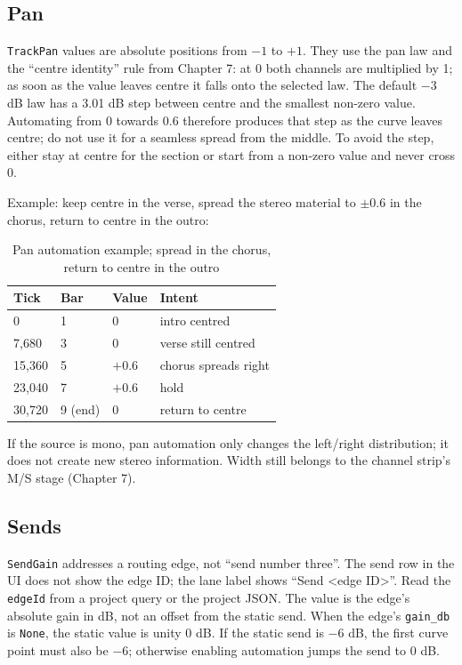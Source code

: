 \subsection{Pan}

\texttt{TrackPan} values are absolute positions from $-1$ to $+1$. They use the pan law and the ``centre identity'' rule from Chapter 7: at $0$ both channels are multiplied by 1; as soon as the value leaves centre it falls onto the selected law. The default $-3$ dB law has a 3.01 dB step between centre and the smallest non-zero value. Automating from $0$ towards $0.6$ therefore produces that step as the curve leaves centre; do not use it for a seamless spread from the middle. To avoid the step, either stay at centre for the section or start from a non-zero value and never cross $0$.

Example: keep centre in the verse, spread the stereo material to $\pm0.6$ in the chorus, return to centre in the outro:

\begin{table}[htbp]
\centering
\small
\begin{tabular}{@{}llll@{}}
\hline
Tick & Bar & Value & Intent \\
\hline
0 & 1 & $0$ & intro centred \\
7{,}680 & 3 & $0$ & verse still centred \\
15{,}360 & 5 & $+0.6$ & chorus spreads right \\
23{,}040 & 7 & $+0.6$ & hold \\
30{,}720 & 9 (end) & $0$ & return to centre \\
\hline
\end{tabular}
\caption{Pan automation example; spread in the chorus, return to centre in the outro}
\label{tab:automation-pan-recipe}
\end{table}

If the source is mono, pan automation only changes the left/right distribution; it does not create new stereo information. Width still belongs to the channel strip's M/S stage (Chapter 7).

\subsection{Sends}

\texttt{SendGain} addresses a routing edge, not ``send number three''. The send row in the UI does not show the edge ID; the lane label shows ``Send <edge ID>''. Read the \texttt{edgeId} from a project query or the project JSON. The value is the edge's absolute gain in dB, not an offset from the static send. When the edge's \texttt{gain\_db} is \texttt{None}, the static value is unity 0 dB. If the static send is $-6$ dB, the first curve point must also be $-6$; otherwise enabling automation jumps the send to 0 dB.

